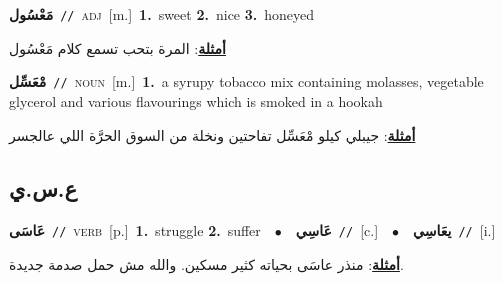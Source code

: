 \documentclass[10pt,a4paper,twoside]{article} %
\begin{document}
\begin{multicols}{2}
{\setlength\topsep{0pt}\textbf{\foreignlanguage{arabic}{مَعْسُول}}\ {\color{gray}\texttt{//}\color{black}}\ \textsc{adj}\ [m.]\ \textbf{1.}~sweet  \textbf{2.}~nice  \textbf{3.}~honeyed\  \begin{flushright}\color{gray}\foreignlanguage{arabic}{\textbf{\underline{\foreignlanguage{arabic}{أمثلة}}}: المرة بتحب تسمع كلام مَعْسُول}\end{flushright}\color{black}} \vspace{2mm}

{\setlength\topsep{0pt}\textbf{\foreignlanguage{arabic}{مْعَسِّل}}\ {\color{gray}\texttt{//}\color{black}}\ \textsc{noun}\ [m.]\ \textbf{1.}~a syrupy tobacco mix containing molasses, vegetable glycerol and various flavourings which is smoked in a hookah\  \begin{flushright}\color{gray}\foreignlanguage{arabic}{\textbf{\underline{\foreignlanguage{arabic}{أمثلة}}}: جيبلي كيلو مْعَسِّل تفاحتين ونخلة من السوق الحرَّة اللي عالجسر}\end{flushright}\color{black}} \vspace{2mm}

\vspace{-3mm}
\subsection*{\color{blue}\foreignlanguage{arabic}{ع.س.ي}\color{blue}{}} 

{\setlength\topsep{0pt}\textbf{\foreignlanguage{arabic}{عَاسَى}}\ {\color{gray}\texttt{//}\color{black}}\ \textsc{verb}\ [p.]\ \textbf{1.}~struggle  \textbf{2.}~suffer\ \ $\bullet$\ \ \setlength\topsep{0pt}\textbf{\foreignlanguage{arabic}{عَاسِي}}\ {\color{gray}\texttt{//}\color{black}}\ [c.]\ \ $\bullet$\ \ \setlength\topsep{0pt}\textbf{\foreignlanguage{arabic}{يعَاسِي}}\ {\color{gray}\texttt{//}\color{black}}\ [i.]\  \begin{flushright}\color{gray}\foreignlanguage{arabic}{\textbf{\underline{\foreignlanguage{arabic}{أمثلة}}}: منذر عاسَى بحياته كثير مسكين. والله مش حمل صدمة جديدة.}\end{flushright}\color{black}} \vspace{2mm}


\end{multicols}
\end{document}
